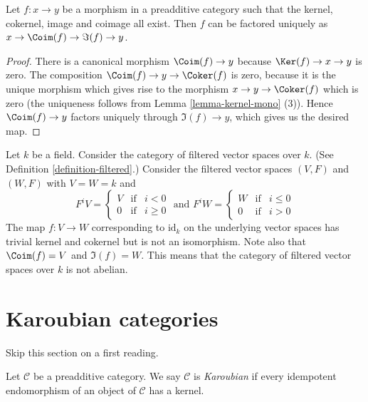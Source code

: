 \begin{lemma}
\label{lemma-coim-im-map}
Let $f : x \to y$ be a morphism in a preadditive category
such that the kernel, cokernel, image and coimage all exist.
Then $f$ can be factored uniquely as
$x \to \Coim(f) \to \Im(f) \to y$.
\end{lemma}

\begin{proof}
There is a canonical morphism $\Coim(f) \to y$
because $\Ker(f) \to x \to y$ is zero.
The composition $\Coim(f) \to y \to \Coker(f)$
is zero, because it is the unique morphism which gives
rise to the morphism $x \to y \to \Coker(f)$ which
is zero
(the uniqueness follows from
Lemma \ref{lemma-kernel-mono} (3)).
Hence $\Coim(f) \to y$ factors uniquely through
$\Im(f) \to y$, which gives us the desired map.
\end{proof}

\begin{example}
\label{example-not-abelian}
Let $k$ be a field.
Consider the category
of filtered vector spaces over $k$.
(See Definition \ref{definition-filtered}.)
Consider the filtered vector spaces $(V, F)$ and $(W, F)$ with
$V = W = k$ and
$$
F^iV
=
\left\{
\begin{matrix}
V & \text{if} & i < 0 \\
0 & \text{if} & i \geq 0
\end{matrix}
\right.
\text{ and }
F^iW
=
\left\{
\begin{matrix}
W & \text{if} & i \leq 0 \\
0 & \text{if} & i > 0
\end{matrix}
\right.
$$
The map $f : V \to W$ corresponding to $\text{id}_k$ on the underlying
vector spaces has trivial kernel and cokernel but is not
an isomorphism. Note also that $\Coim(f) = V$ and $\Im(f) = W$.
This means that the category of filtered vector spaces over $k$
is not abelian.
\end{example}





\section{Karoubian categories}
\label{section-karoubian}

\noindent
Skip this section on a first reading.

\begin{definition}
\label{definition-karoubian}
Let $\mathcal{C}$ be a preadditive category. We say $\mathcal{C}$
is {\it Karoubian} if every idempotent endomorphism of an object
of $\mathcal{C}$ has a kernel.
\end{definition}


